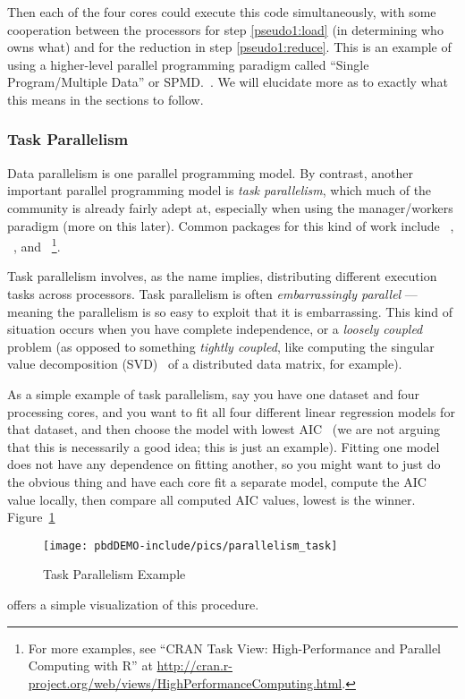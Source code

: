 Then each of the four cores could execute this code simultaneously, with some
cooperation between the processors for step \ref{pseudo1:load} (in determining
who owns what) and for the reduction in step \ref{pseudo1:reduce}. This is
an example of using a higher-level parallel programming paradigm called
``Single Program/Multiple Data''
or SPMD.~.  We will elucidate more as to exactly what 
this means in the sections to follow.



\subsubsection{Task Parallelism}

Data parallelism is one parallel programming model. By contrast, another
important parallel programming model is \emph{task 
parallelism}, which much of the 
 community is already fairly adept at, especially when using the 
manager/workers paradigm
(more on this later).  Common packages for this kind of work include 
~\citep{Tierney2012}, 
~\citep{parallel}, and 
~\citep{Rmpi}\footnote{For more examples, 
see ``CRAN Task View: High-Performance and Parallel Computing with R'' at 
\url{http://cran.r-project.org/web/views/HighPerformanceComputing.html}.}.

Task parallelism involves, as the name implies, distributing different execution
tasks across processors. Task parallelism is often \emph{embarrassingly 
parallel} --- meaning the 
parallelism is so easy to exploit that it is embarrassing. This kind of 
situation occurs when you have complete independence, or a \emph{loosely 
coupled} problem (as opposed to something 
\emph{tightly coupled}, like computing the 
singular value decomposition (SVD)~ of a distributed data matrix, for 
example).  

As a simple example of task parallelism, say you have one dataset and four
processing cores, and you want to fit all four different linear regression
models for that dataset, and then choose the model with lowest
AIC~\citep{aic} (we are not arguing that this is necessarily a good idea; this
is just an example). Fitting one model does not have any dependence on
fitting another, so you might want to just do the obvious thing and have each
core fit a separate model, compute the AIC value locally, then compare all
computed AIC values, lowest is the winner. Figure~\ref{fig:taskparallel} 
\begin{figure}[h]
 \centering
 \texttt{[image: pbdDEMO-include/pics/parallelism\_task]}
 \caption{Task Parallelism Example}
 \label{fig:taskparallel}
\end{figure}
offers a simple visualization of this procedure.


